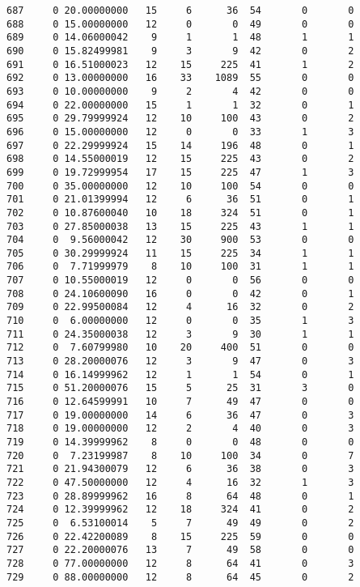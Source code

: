 \documentclass[
  letterpaper,
  DIV=11,
  numbers=noendperiod]{scrreprt}
\begin{document}
\begin{verbatim}
687     0 20.00000000   15     6      36  54       0       0
688     0 15.00000000   12     0       0  49       0       0
689     0 14.06000042    9     1       1  48       1       1
690     0 15.82499981    9     3       9  42       0       2
691     0 16.51000023   12    15     225  41       1       2
692     0 13.00000000   16    33    1089  55       0       0
693     0 10.00000000    9     2       4  42       0       0
694     0 22.00000000   15     1       1  32       0       1
695     0 29.79999924   12    10     100  43       0       2
696     0 15.00000000   12     0       0  33       1       3
697     0 22.29999924   15    14     196  48       0       1
698     0 14.55000019   12    15     225  43       0       2
699     0 19.72999954   17    15     225  47       1       3
700     0 35.00000000   12    10     100  54       0       0
701     0 21.01399994   12     6      36  51       0       1
702     0 10.87600040   10    18     324  51       0       1
703     0 27.85000038   13    15     225  43       1       1
704     0  9.56000042   12    30     900  53       0       0
705     0 30.29999924   11    15     225  34       1       1
706     0  7.71999979    8    10     100  31       1       1
707     0 10.55000019   12     0       0  56       0       0
708     0 24.10600090   16     0       0  42       0       1
709     0 22.99500084   12     4      16  32       0       2
710     0  6.00000000   12     0       0  35       1       3
711     0 24.35000038   12     3       9  30       1       1
712     0  7.60799980   10    20     400  51       0       0
713     0 28.20000076   12     3       9  47       0       3
714     0 16.14999962   12     1       1  54       0       1
715     0 51.20000076   15     5      25  31       3       0
716     0 12.64599991   10     7      49  47       0       0
717     0 19.00000000   14     6      36  47       0       3
718     0 19.00000000   12     2       4  40       0       3
719     0 14.39999962    8     0       0  48       0       0
720     0  7.23199987    8    10     100  34       0       7
721     0 21.94300079   12     6      36  38       0       3
722     0 47.50000000   12     4      16  32       1       3
723     0 28.89999962   16     8      64  48       0       1
724     0 12.39999962   12    18     324  41       0       2
725     0  6.53100014    5     7      49  49       0       2
726     0 22.42200089    8    15     225  59       0       0
727     0 22.20000076   13     7      49  58       0       0
728     0 77.00000000   12     8      64  41       0       3
729     0 88.00000000   12     8      64  45       0       2

\end{verbatim}
\end{document}
